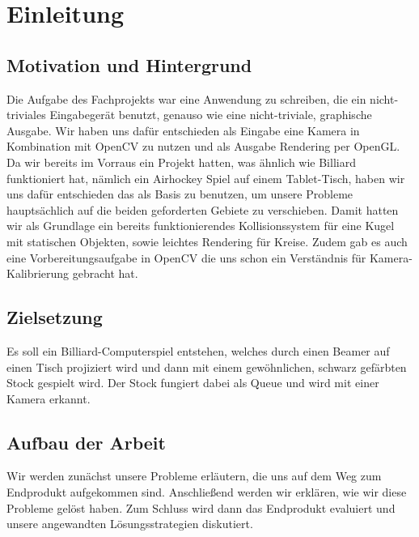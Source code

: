 
\chapter{Einleitung}

\section{Motivation und Hintergrund}
Die Aufgabe des Fachprojekts war eine Anwendung zu schreiben, die ein nicht-triviales Eingabegerät benutzt, genauso wie eine nicht-triviale, graphische Ausgabe. Wir haben uns dafür entschieden als Eingabe eine Kamera in Kombination mit OpenCV zu nutzen und als Ausgabe Rendering per OpenGL. Da wir bereits im Vorraus ein Projekt hatten, was ähnlich wie Billiard funktioniert hat, nämlich ein Airhockey Spiel auf einem Tablet-Tisch, haben wir uns dafür entschieden das als Basis zu benutzen, um unsere Probleme hauptsächlich auf die beiden geforderten Gebiete zu verschieben. Damit hatten wir als Grundlage ein bereits funktionierendes Kollisionssystem für eine Kugel mit statischen Objekten, sowie leichtes Rendering für Kreise. Zudem gab es auch eine Vorbereitungsaufgabe in OpenCV die uns schon ein Verständnis für Kamera-Kalibrierung gebracht hat. 
\section{Zielsetzung}
Es soll ein Billiard-Computerspiel entstehen, welches durch einen Beamer auf einen Tisch projiziert wird und dann mit einem gewöhnlichen, schwarz gefärbten Stock gespielt wird. Der Stock fungiert dabei als Queue und wird mit einer Kamera erkannt. 
\section{Aufbau der Arbeit}
Wir werden zunächst unsere Probleme erläutern, die uns auf dem Weg zum Endprodukt aufgekommen sind. Anschließend werden wir erklären, wie wir diese Probleme gelöst haben. Zum Schluss wird dann das Endprodukt evaluiert und unsere angewandten Lösungsstrategien diskutiert.

